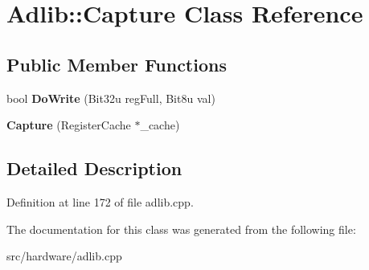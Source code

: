 \hypertarget{classAdlib_1_1Capture}{\section{Adlib\-:\-:Capture Class Reference}
\label{classAdlib_1_1Capture}
}
\subsection*{Public Member Functions}
\begin{DoxyCompactItemize}
\item 
\hypertarget{classAdlib_1_1Capture_a2bc4e88dfc7ead50b3cd50fded3cfbaa}{bool {\bfseries Do\-Write} (Bit32u reg\-Full, Bit8u val)}\label{classAdlib_1_1Capture_a2bc4e88dfc7ead50b3cd50fded3cfbaa}

\item 
\hypertarget{classAdlib_1_1Capture_a42d440dbc3803819534a51e9434c8f4e}{{\bfseries Capture} (Register\-Cache $\ast$\-\_\-cache)}\label{classAdlib_1_1Capture_a42d440dbc3803819534a51e9434c8f4e}

\end{DoxyCompactItemize}


\subsection{Detailed Description}


Definition at line 172 of file adlib.\-cpp.



The documentation for this class was generated from the following file\-:\begin{DoxyCompactItemize}
\item 
src/hardware/adlib.\-cpp\end{DoxyCompactItemize}

